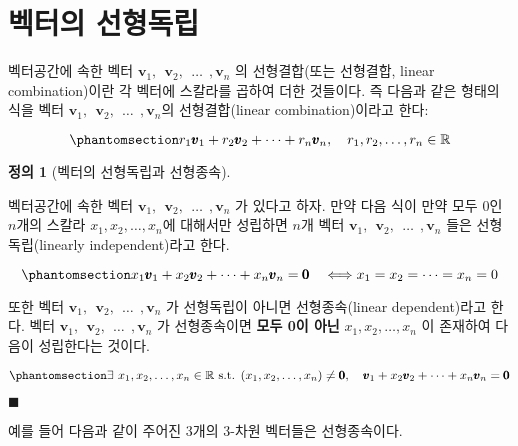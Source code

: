 \documentclass[
  11pt,
  a4paper,
  oneside]{scrbook}
\newcommand{\RR}{\mathbb{R}}
\theoremstyle{definition}
\theoremstyle{plain}
\theoremstyle{definition}
\newtheorem{definition}{정의}[chapter]
\theoremstyle{definition}
\theoremstyle{remark}
\begin{document}
\section{벡터의
선형독립}\label{uxbca1uxd130uxc758-uxc120uxd615uxb3c5uxb9bd}

벡터공간에 속한 벡터 \(\pmb v_1, ~~ \pmb v_2, ~~\dots ~~, \pmb v_n\) 의
선형결합(또는 선형결합, linear combination)이란 각 벡터에 스칼라를
곱하여 더한 것들이다. 즉 다음과 같은 형태의 식을 벡터
\(\pmb v_1, ~~ \pmb v_2, ~~\dots ~~, \pmb v_n\)의 선형결합(linear
combination)이라고 한다:

\begin{equation}\phantomsection\label{eq-lin-comb}{ r_1 \pmb v_1 + r_2 \pmb v_2 + \cdots + r_n \pmb v_n, \quad r_1,r_2,\dots, r_n \in \RR }\end{equation}

\begin{definition}[벡터의 선형독립과
선형종속]\protect\hypertarget{def-linear-indep}{}\label{def-linear-indep}

벡터공간에 속한 벡터 \(\pmb v_1, ~~ \pmb v_2, ~~\dots ~~, \pmb v_n\) 가
있다고 하자. 만약 다음 식이 만약 모두 \(0\)인 \(n\)개의 스칼라
\(x_1,x_2,\dots,x_n\)에 대해서만 성립하면 \(n\)개 벡터
\(\pmb v_1, ~~ \pmb v_2, ~~\dots ~~, \pmb v_n\) 들은 선형독립(linearly
independent)라고 한다.

\begin{equation}\phantomsection\label{eq-linear-indep}{
x_1 \pmb v_1 + x_2 \pmb v_2 + \dots + x_n \pmb v_n = \pmb 0 \quad \Longleftrightarrow
x_1 = x_2 = \dots = x_n =0
}\end{equation}

또한 벡터 \(\pmb v_1, ~~ \pmb v_2, ~~\dots ~~, \pmb v_n\) 가 선형독립이
아니면 선형종속(linear dependent)라고 한다. 벡터
\(\pmb v_1, ~~ \pmb v_2, ~~\dots ~~, \pmb v_n\) 가 선형종속이면
\textbf{모두 0이 아닌} \(x_1,x_2,\dots,x_n\) 이 존재하여 다음이
성립한다는 것이다.

\begin{equation}\phantomsection\label{eq-linear-dep}{
\exists~ x_1,x_2,\dots,x_n \in \RR \text{ s.t. } (x_1,x_2,\dots,x_n) \ne \pmb 0,\quad  \pmb v_1 + x_2 \pmb v_2 + \dots + x_n \pmb v_n = \pmb 0 
}\end{equation}

\(\blacksquare\)

\end{definition}

예를 들어 다음과 같이 주어진 3개의 3-차원 벡터들은 선형종속이다.
\end{document}
